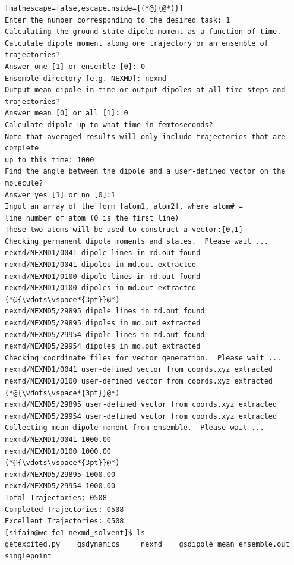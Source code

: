 \documentclass[letterpaper,12pt,titlepage]{article}
\begin{document}
\begin{lstlisting}[mathescape=false,escapeinside={(*@}{@*)}]
Enter the number corresponding to the desired task: 1
Calculating the ground-state dipole moment as a function of time.
Calculate dipole moment along one trajectory or an ensemble of trajectories?
Answer one [1] or ensemble [0]: 0
Ensemble directory [e.g. NEXMD]: nexmd
Output mean dipole in time or output dipoles at all time-steps and trajectories?
Answer mean [0] or all [1]: 0
Calculate dipole up to what time in femtoseconds?
Note that averaged results will only include trajectories that are complete
up to this time: 1000
Find the angle between the dipole and a user-defined vector on the molecule?
Answer yes [1] or no [0]:1
Input an array of the form [atom1, atom2], where atom# = 
line number of atom (0 is the first line)
These two atoms will be used to construct a vector:[0,1]
Checking permanent dipole moments and states.  Please wait ...
nexmd/NEXMD1/0041 dipole lines in md.out found
nexmd/NEXMD1/0041 dipoles in md.out extracted
nexmd/NEXMD1/0100 dipole lines in md.out found
nexmd/NEXMD1/0100 dipoles in md.out extracted
(*@{\vdots\vspace*{3pt}}@*)
nexmd/NEXMD5/29895 dipole lines in md.out found
nexmd/NEXMD5/29895 dipoles in md.out extracted
nexmd/NEXMD5/29954 dipole lines in md.out found
nexmd/NEXMD5/29954 dipoles in md.out extracted
Checking coordinate files for vector generation.  Please wait ...
nexmd/NEXMD1/0041 user-defined vector from coords.xyz extracted
nexmd/NEXMD1/0100 user-defined vector from coords.xyz extracted
(*@{\vdots\vspace*{3pt}}@*)
nexmd/NEXMD5/29895 user-defined vector from coords.xyz extracted
nexmd/NEXMD5/29954 user-defined vector from coords.xyz extracted
Collecting mean dipole moment from ensemble.  Please wait ...
nexmd/NEXMD1/0041 1000.00
nexmd/NEXMD1/0100 1000.00
(*@{\vdots\vspace*{3pt}}@*)
nexmd/NEXMD5/29895 1000.00
nexmd/NEXMD5/29954 1000.00
Total Trajectories: 0508
Completed Trajectories: 0508
Excellent Trajectories: 0508
[sifain@wc-fe1 nexmd_solvent]$ ls
getexcited.py    gsdynamics     nexmd    gsdipole_mean_ensemble.out    singlepoint
\end{lstlisting}

\newpage
\end{document}
